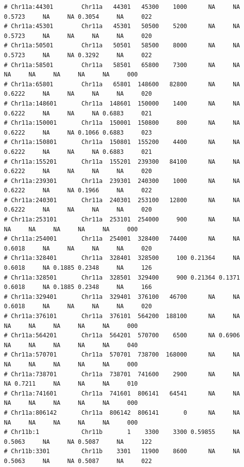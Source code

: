 \documentclass{article}\usepackage[]{graphicx}\usepackage[]{color}
\makeatletter
\newenvironment{kframe}{%
 \def\at@end@of@kframe{}%
 \ifinner\ifhmode%
  \def\at@end@of@kframe{\end{minipage}}%
  \begin{minipage}{\columnwidth}%
 \fi\fi%
 \def\FrameCommand##1{\hskip\@totalleftmargin \hskip-\fboxsep
 \colorbox{shadecolor}{##1}\hskip-\fboxsep
     \hskip-\linewidth \hskip-\@totalleftmargin \hskip\columnwidth}%
 \MakeFramed {\advance\hsize-\width
   \@totalleftmargin\z@ \linewidth\hsize
   \@setminipage}}%
 {\par\unskip\endMakeFramed%
 \at@end@of@kframe}
\newenvironment{knitrout}{}{} %
\makeatother
\begin{document}
\begin{knitrout}
\begin{kframe}
\begin{verbatim}
# Chr11a:44301        Chr11a   44301   45300    1000      NA     NA 0.5723     NA     NA 0.3054     NA     022
# Chr11a:45301        Chr11a   45301   50500    5200      NA     NA 0.5723     NA     NA     NA     NA     020
# Chr11a:50501        Chr11a   50501   58500    8000      NA     NA 0.5723     NA     NA 0.3292     NA     022
# Chr11a:58501        Chr11a   58501   65800    7300      NA     NA     NA     NA     NA     NA     NA     000
# Chr11a:65801        Chr11a   65801  148600   82800      NA     NA 0.6222     NA     NA     NA     NA     020
# Chr11a:148601       Chr11a  148601  150000    1400      NA     NA 0.6222     NA     NA     NA 0.6883     021
# Chr11a:150001       Chr11a  150001  150800     800      NA     NA 0.6222     NA     NA 0.1066 0.6883     023
# Chr11a:150801       Chr11a  150801  155200    4400      NA     NA 0.6222     NA     NA     NA 0.6883     021
# Chr11a:155201       Chr11a  155201  239300   84100      NA     NA 0.6222     NA     NA     NA     NA     020
# Chr11a:239301       Chr11a  239301  240300    1000      NA     NA 0.6222     NA     NA 0.1966     NA     022
# Chr11a:240301       Chr11a  240301  253100   12800      NA     NA 0.6222     NA     NA     NA     NA     020
# Chr11a:253101       Chr11a  253101  254000     900      NA     NA     NA     NA     NA     NA     NA     000
# Chr11a:254001       Chr11a  254001  328400   74400      NA     NA 0.6018     NA     NA     NA     NA     020
# Chr11a:328401       Chr11a  328401  328500     100 0.21364     NA 0.6018     NA 0.1885 0.2348     NA     126
# Chr11a:328501       Chr11a  328501  329400     900 0.21364 0.1371 0.6018     NA 0.1885 0.2348     NA     166
# Chr11a:329401       Chr11a  329401  376100   46700      NA     NA 0.6018     NA     NA     NA     NA     020
# Chr11a:376101       Chr11a  376101  564200  188100      NA     NA     NA     NA     NA     NA     NA     000
# Chr11a:564201       Chr11a  564201  570700    6500      NA 0.6906     NA     NA     NA     NA     NA     040
# Chr11a:570701       Chr11a  570701  738700  168000      NA     NA     NA     NA     NA     NA     NA     000
# Chr11a:738701       Chr11a  738701  741600    2900      NA     NA     NA 0.7211     NA     NA     NA     010
# Chr11a:741601       Chr11a  741601  806141   64541      NA     NA     NA     NA     NA     NA     NA     000
# Chr11a:806142       Chr11a  806142  806141       0      NA     NA     NA     NA     NA     NA     NA     000
# Chr11b:1            Chr11b       1    3300    3300 0.59855     NA 0.5063     NA     NA 0.5087     NA     122
# Chr11b:3301         Chr11b    3301   11900    8600      NA     NA 0.5063     NA     NA 0.5087     NA     022

\end{verbatim}
\end{kframe}
\end{knitrout}
\end{document}
